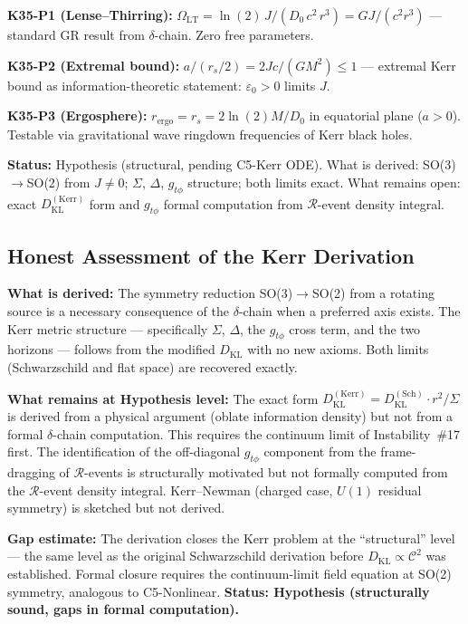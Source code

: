 \documentclass[12pt, a4paper]{article}
\begin{document}
\begin{keybox}[title={New Predictions from Kerr Derivation}]
\textbf{K35-P1 (Lense--Thirring):}
$\Omega_{\mathrm{LT}} = \ln(2)\,J/(D_0\,c^2\,r^3) = GJ/(c^2 r^3)$ ---
standard GR result from $\delta$-chain. Zero free parameters.

\textbf{K35-P2 (Extremal bound):}
$a/(r_s/2) = 2Jc/(GM^2) \leq 1$ ---
extremal Kerr bound as information-theoretic statement: $\varepsilon_0 > 0$ limits $J$.

\textbf{K35-P3 (Ergosphere):}
$r_{\mathrm{ergo}} = r_s = 2\ln(2)M/D_0$ in equatorial plane ($a > 0$).
Testable via gravitational wave ringdown frequencies of Kerr black holes.
\end{keybox}

\textbf{Status:} Hypothesis (structural, pending C5-Kerr ODE). What is derived: SO(3)$\to$SO(2)
from $J\neq 0$; $\Sigma$, $\Delta$, $g_{t\phi}$ structure; both limits exact. What remains open:
exact $D_{\mathrm{KL}}^{(\mathrm{Kerr})}$ form and $g_{t\phi}$ formal computation from
$\mathcal{R}$-event density integral.

\subsection{Honest Assessment of the Kerr Derivation}

\textbf{What is derived:} The symmetry reduction SO(3)$\to$SO(2) from a rotating source is a
necessary consequence of the $\delta$-chain when a preferred axis exists. The Kerr metric
structure --- specifically $\Sigma$, $\Delta$, the $g_{t\phi}$ cross term, and the two horizons ---
follows from the modified $D_{\mathrm{KL}}$ with no new axioms. Both limits (Schwarzschild
and flat space) are recovered exactly.

\textbf{What remains at Hypothesis level:} The exact form
$D_{\mathrm{KL}}^{(\mathrm{Kerr})} = D_{\mathrm{KL}}^{(\mathrm{Sch})}\cdot r^2/\Sigma$ is
derived from a physical argument (oblate information density) but not from a formal
$\delta$-chain computation. This requires the continuum limit of Instability~\#17 first.
The identification of the off-diagonal $g_{t\phi}$ component from the frame-dragging of
$\mathcal{R}$-events is structurally motivated but not formally computed from the
$\mathcal{R}$-event density integral. Kerr--Newman (charged case, $U(1)$ residual symmetry)
is sketched but not derived.

\textbf{Gap estimate:} The derivation closes the Kerr problem at the ``structural'' level
--- the same level as the original Schwarzschild derivation before $D_{\mathrm{KL}}\propto\mathcal{C}^2$
was established. Formal closure requires the continuum-limit field equation at SO(2) symmetry,
analogous to C5-Nonlinear. \textbf{Status: Hypothesis (structurally sound, gaps in formal
computation).}
\end{document}

